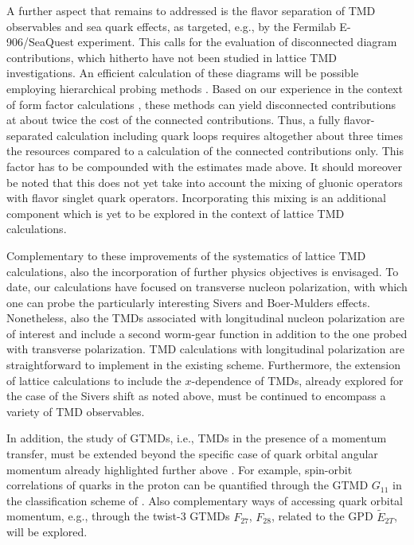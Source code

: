 A further aspect that remains to addressed is the flavor separation
of TMD observables and sea quark effects, as targeted, e.g., by the Fermilab
E-906/SeaQuest experiment. This calls for the evaluation of disconnected
diagram contributions, which hitherto have not been studied in lattice TMD
investigations. An efficient calculation of these diagrams will be possible
employing hierarchical probing methods \cite{Stathopoulos:2013aci}.
Based on our experience
in the context of form factor calculations \cite{Green:2015wqa}, these methods
can yield disconnected contributions at about twice the cost of the connected
contributions. Thus, a fully flavor-separated calculation including
quark loops requires altogether about three times the resources compared
to a calculation of the connected contributions only. This factor has to
be compounded with the estimates made above. It should moreover be
noted that this does not yet take into account the mixing of gluonic
operators with flavor singlet quark operators. Incorporating this mixing
is an additional component which is yet to be explored in the context
of lattice TMD calculations.

Complementary to these improvements of the systematics of lattice TMD
calculations, also the incorporation of further physics objectives is
envisaged. To date, our calculations have focused on transverse nucleon
polarization, with which one can probe the particularly interesting
Sivers and Boer-Mulders effects. Nonetheless, also the TMDs associated
with longitudinal nucleon polarization are of interest and include a
second worm-gear function in addition to the one probed with transverse
polarization. TMD calculations with longitudinal polarization are
straightforward to implement in the existing scheme. Furthermore, the
extension of lattice calculations to include the $x$-dependence of TMDs,
already explored for the case of the Sivers shift as noted above, must be
continued to encompass a variety of TMD observables.

In addition, the study of GTMDs, i.e., TMDs in the presence of a
momentum transfer, must be extended beyond the specific case of quark
orbital angular momentum already highlighted further above
\cite{Engelhardt:2017miy}. For example, spin-orbit correlations of quarks
in the proton can be quantified through the GTMD $G_{11} $ in the
classification scheme of \cite{Meissner:2009ww}.
Also complementary ways of accessing quark orbital
momentum, e.g., through the twist-3 GTMDs $F_{27} $, $F_{28} $, related
to the GPD $\widetilde{E}_{2T} $, will be explored.











